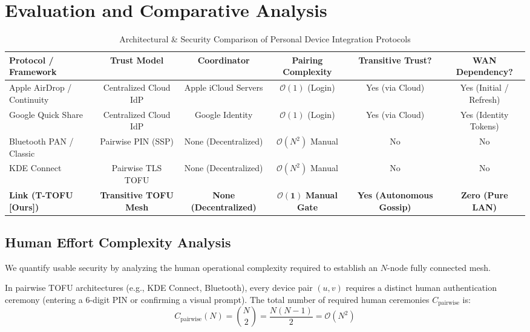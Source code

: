 \documentclass[conference,a4paper]{IEEEtran}
\begin{document}
\section{Evaluation and Comparative Analysis}

\begin{table}[t]
\caption{Architectural \& Security Comparison of Personal Device Integration Protocols}
\label{tab:comparison}
\centering
\footnotesize
\setlength{\tabcolsep}{4pt}
\begin{tabular}{@{}lccccc@{}}
\toprule
\textbf{Protocol / Framework} & \textbf{Trust Model} & \textbf{Coordinator} & \textbf{Pairing Complexity} & \textbf{Transitive Trust?} & \textbf{WAN Dependency?} \\ \midrule
Apple AirDrop / Continuity    & Centralized Cloud IdP & Apple iCloud Servers & $\mathcal{O}(1)$ (Login)    & Yes (via Cloud)            & Yes (Initial / Refresh)  \\
Google Quick Share            & Centralized Cloud IdP & Google Identity      & $\mathcal{O}(1)$ (Login)    & Yes (via Cloud)            & Yes (Identity Tokens)    \\
Bluetooth PAN / Classic       & Pairwise PIN (SSP)    & None (Decentralized) & $\mathcal{O}(N^2)$ Manual   & No                         & No                       \\
KDE Connect                   & Pairwise TLS TOFU     & None (Decentralized) & $\mathcal{O}(N^2)$ Manual   & No                         & No                       \\
\textbf{Link (T-TOFU [Ours])} & \textbf{Transitive TOFU Mesh} & \textbf{None (Decentralized)} & $\boldsymbol{\mathcal{O}(1)}$ \textbf{Manual Gate} & \textbf{Yes (Autonomous Gossip)} & \textbf{Zero (Pure LAN)} \\ \bottomrule
\end{tabular}
\end{table}

\subsection{Human Effort Complexity Analysis}
We quantify usable security by analyzing the human operational complexity required to establish an $N$-node fully connected mesh.

In pairwise TOFU architectures (e.g., KDE Connect, Bluetooth), every device pair $(u, v)$ requires a distinct human authentication ceremony (entering a 6-digit PIN or confirming a visual prompt). The total number of required human ceremonies $C_{\text{pairwise}}$ is:
\begin{equation}
    C_{\text{pairwise}}(N) = \binom{N}{2} = \frac{N(N-1)}{2} = \mathcal{O}(N^2)
\end{equation}
\end{document}
